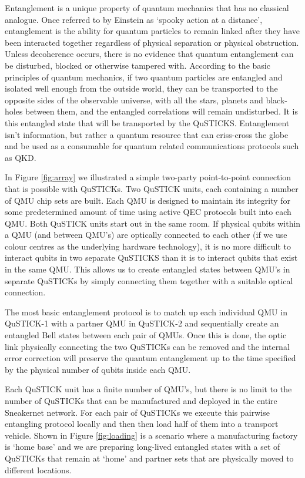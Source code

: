 \documentclass[twocolumn, aps, rmp, amsmath, amssymb, nofootinbib, superscriptaddress, longbibliography, floatfix, table-of-contents, eqsecnum]{revtex4-2}
\begin{document}
Entanglement is a unique property of quantum mechanics that has no classical analogue. Once referred to by Einstein as `spooky action at a distance', entanglement is the ability for quantum particles to remain linked after they have been interacted together regardless of physical separation or physical obstruction. Unless decoherence occurs, there is no evidence that quantum entanglement can be disturbed, blocked or otherwise tampered with. According to the basic principles of quantum mechanics, if two quantum particles are entangled and isolated well enough from the outside world, they can be transported to the opposite sides of the observable universe, with all the stars, planets and black-holes between them, and the entangled correlations will remain undisturbed. It is this entangled state that will be transported by the QuSTICKS. Entanglement isn't information, but rather a quantum resource that can criss-cross the globe and be used as a consumable for quantum related communications protocols such as QKD. 

In Figure \ref{fig:array} we illustrated a simple two-party point-to-point connection that is possible with QuSTICKs. Two QuSTICK units, each containing a number of QMU chip sets are built. Each QMU is designed to maintain its integrity for some predetermined amount of time using active QEC protocols built into each QMU. Both QuSTICK units start out in the same room. If physical qubits within a QMU (and between QMU's) are optically connected to each other (if we use colour centres as the underlying hardware technology), it is no more difficult to interact qubits in two separate QuSTICKS than it is to interact qubits that exist in the same QMU. This allows us to create entangled states between QMU's in separate QuSTICKs by simply connecting them together with a suitable optical connection. 

The most basic entanglement protocol is to match up each individual QMU in QuSTICK-1 with a partner QMU in QuSTICK-2 and sequentially create an entangled Bell states between each pair of QMUs. Once this is done, the optic link physically connecting the two QuSTICKs can be removed and the internal error correction will preserve the quantum entanglement up to the time specified by the physical number of qubits inside each QMU.

Each QuSTICK unit has a finite number of QMU's, but there is no limit to the number of QuSTICKs that can be manufactured and deployed in the entire Sneakernet network. For each pair of QuSTICKs we execute this pairwise entangling protocol locally and then then load half of them into a transport vehicle. Shown in Figure \ref{fig:loading} is a scenario where a manufacturing factory is `home base' and we are preparing long-lived entangled states with a set of QuSTICKs that remain at `home' and partner sets that are physically moved to different locations. 
\end{document}
